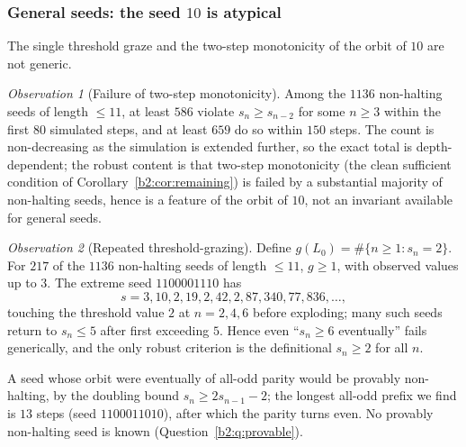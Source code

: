 \documentclass[a4paper]{article}
\theoremstyle{plain}
\theoremstyle{definition}
\theoremstyle{remark}
\newtheorem{observation}{Observation}[subsection]
\begin{document}
\subsubsection{General seeds: the seed $10$ is atypical}\label{b2:sec:general}
The single threshold graze and the two-step monotonicity of the orbit of $10$ are not generic.

\begin{observation}[Failure of two-step monotonicity]\label{b2:obs:mono}
Among the $1136$ non-halting seeds of length $\le 11$, at least $586$ violate $s_n\ge s_{n-2}$ for some $n\ge 3$ within the first $80$ simulated steps, and at least $659$ do so within $150$ steps. The count is non-decreasing as the simulation is extended further, so the exact total is depth-dependent; the robust content is that two-step monotonicity (the clean sufficient condition of Corollary~\ref{b2:cor:remaining}) is failed by a substantial majority of non-halting seeds, hence is a feature of the orbit of $10$, not an invariant available for general seeds.
\end{observation}

\begin{observation}[Repeated threshold-grazing]\label{b2:obs:graze}
Define $g(L_0)=\#\{n\ge 1:s_n=2\}$. For $217$ of the $1136$ non-halting seeds of length $\le 11$, $g\ge 1$, with observed values up to $3$. The extreme seed $1100001110$ has
\[ s=3,10,2,19,2,42,2,87,340,77,836,\dots, \]
touching the threshold value $2$ at $n=2,4,6$ before exploding; many such seeds return to $s_n\le 5$ after first exceeding $5$. Hence even ``$s_n\ge 6$ eventually'' fails generically, and the only robust criterion is the definitional $s_n\ge 2$ for all $n$.
\end{observation}

A seed whose orbit were eventually of all-odd parity would be provably non-halting, by the doubling bound $s_n\ge 2s_{n-1}-2$; the longest all-odd prefix we find is $13$ steps (seed $1100011010$), after which the parity turns even. No provably non-halting seed is known (Question~\ref{b2:q:provable}).
\end{document}
